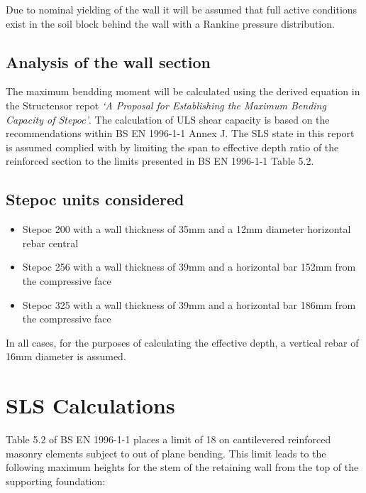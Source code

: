 \documentclass[11pt]{article}
\providecommand{\tightlist}{%
      \setlength{\itemsep}{0pt}\setlength{\parskip}{0pt}}
\begin{document}
Due to nominal yielding of the wall it will be assumed that full active
conditions exist in the soil block behind the wall with a Rankine
pressure distribution.

\hypertarget{analysis-of-the-wall-section}{%
\subsection{Analysis of the wall
section}\label{analysis-of-the-wall-section}}

The maximum bendding moment will be calculated using the derived
equation in the Structensor repot \emph{`A Proposal for Establishing the
Maximum Bending Capacity of Stepoc'}. The calculation of ULS shear
capacity is based on the recommendations within BS EN 1996-1-1 Annex J.
The SLS state in this report is assumed complied with by limiting the
span to effective depth ratio of the reinforced section to the limits
presented in BS EN 1996-1-1 Table 5.2.

\hypertarget{stepoc-units-considered}{%
\subsection{Stepoc units considered}\label{stepoc-units-considered}}

\begin{itemize}
\tightlist
\item
  Stepoc 200 with a wall thickness of 35mm and a 12mm diameter
  horizontal rebar central
\item
  Stepoc 256 with a wall thickness of 39mm and a horizontal bar 152mm
  from the compressive face
\item
  Stepoc 325 with a wall thickness of 39mm and a horizontal bar 186mm
  from the compressive face
\end{itemize}

In all cases, for the purposes of calculating the effective depth, a
vertical rebar of 16mm diameter is assumed.

\hypertarget{sls-calculations}{%
\section{SLS Calculations}\label{sls-calculations}}

Table 5.2 of BS EN 1996-1-1 places a limit of 18 on cantilevered
reinforced masonry elements subject to out of plane bending. This limit
leads to the following maximum heights for the stem of the retaining
wall from the top of the supporting foundation:
\end{document}
